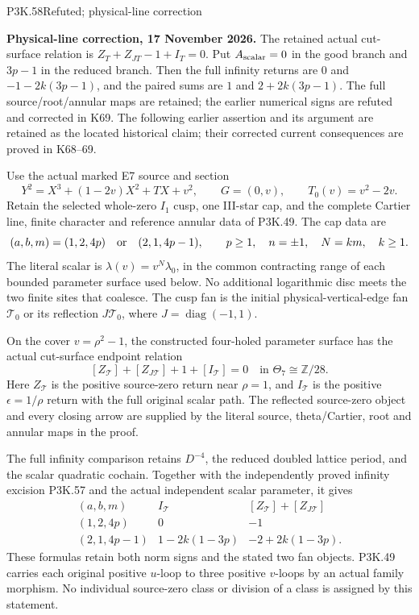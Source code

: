 \begin{statement}{P3K.58}{Refuted; physical-line correction}\par\noindent\textbf{Physical-line correction, 17 November 2026.} The retained actual cut-surface relation is \(Z_T+Z_{JT}-1+I_T=0\). Put \(A_{\rm scalar}=0\) in the good branch and \(3p-1\) in the reduced branch. Then the full infinity returns are \(0\) and \(-1-2k(3p-1)\), and the paired sums are \(1\) and \(2+2k(3p-1)\). The full source/root/annular maps are retained; the earlier numerical signs are refuted and corrected in K69. The following earlier assertion and its argument are retained as the located historical claim; their corrected current consequences are proved in K68--69.\medskip\par 

Use the actual marked E7 source and section
\[
 Y^2=X^3+(1-2v)X^2+TX+v^2,\qquad
 G=(0,v),\qquad T_0(v)=v^2-2v.
\]
Retain the selected whole-zero \(I_1\) cusp, one III-star cap,
and the complete Cartier line, finite character and reference
annular data of P3K.49. The cap data are
\[
 (a,b,m)=(1,2,4p)\quad\hbox{or}\quad(2,1,4p-1),
 \qquad p\ge1,\quad n=\pm1,\quad
 N=km,\quad k\ge1.
\]
The literal scalar is \(\lambda(v)=v^N\lambda_0\), in the
common contracting range of each bounded parameter surface
used below. No additional logarithmic disc meets the two
finite sites that coalesce. The cusp fan is the initial
physical-vertical-edge fan \(\mathcal T_0\) or its reflection
\(J\mathcal T_0\), where \(J=\operatorname{diag}(-1,1)\).

On the cover \(v=\rho^2-1\), the constructed four-holed
parameter surface has the actual cut-surface endpoint relation
\[
 [Z_{\mathcal T}]+[Z_{J\mathcal T}]+1+[I_{\mathcal T}]=0
                    \quad\text{in }\Theta_7\cong\mathbb Z/28.
\]
Here \(Z_{\mathcal T}\) is the positive source-zero return
near \(\rho=1\), and \(I_{\mathcal T}\) is the positive
\(\epsilon=1/\rho\) return with the full original scalar
path. The reflected source-zero object and every closing
arrow are supplied by the literal source, theta/Cartier,
root and annular maps in the proof.

The full infinity comparison retains \(D^{-4}\), the reduced
doubled lattice period, and the scalar quadratic cochain.
Together with the independently proved infinity excision
P3K.57 and the actual independent scalar parameter, it gives
\[
 \begin{array}{c|c|c}
 (a,b,m)&I_{\mathcal T}
                &[Z_{\mathcal T}]+[Z_{J\mathcal T}]\\ \hline
 (1,2,4p)&0&-1\\
 (2,1,4p-1)&1-2k(1-3p)&-2+2k(1-3p).
 \end{array}
\]
These formulas retain both norm signs and the stated two
fan objects. P3K.49 carries each original positive \(u\)-loop
to three positive \(v\)-loops by an actual family morphism.
No individual source-zero class or division of a class is
assigned by this statement.
\end{statement}
